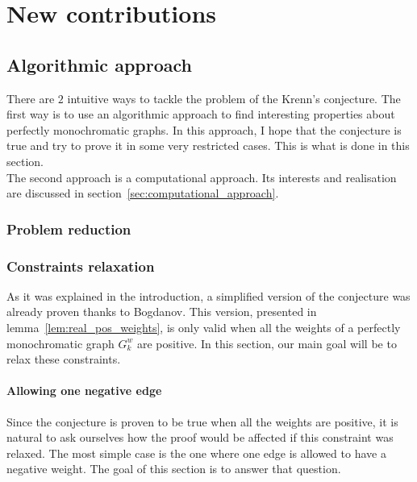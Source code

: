 \chapter{New contributions}


\section{Algorithmic approach}
\label{sec:algo_approach}

There are $2$ intuitive ways to tackle the problem of the Krenn's conjecture.
The first way is to use an algorithmic approach to find interesting properties about perfectly monochromatic graphs.
In this approach, I hope that the conjecture is true and try to prove it in some very restricted cases.
This is what is done in this section.\\

The second approach is a computational approach.
Its interests and realisation are discussed in section~\ref{sec:computational_approach}.

\subsection{Problem reduction}
\label{subsec:problem_reduction}

\subsection{Constraints relaxation}
\label{subsec:constraints_relaxation}

As it was explained in the introduction, a simplified version of the conjecture was already proven thanks to Bogdanov.\cite{bogdanov}
This version, presented in lemma~\ref{lem:real_pos_weights}, is only valid when all the weights of a perfectly monochromatic graph $G_k^w$ are positive.
In this section, our main goal will be to relax these constraints.

\subsubsection{Allowing one negative edge}
\label{subsubsec:one_negative_edge}

Since the conjecture is proven to be true when all the weights are positive, it is natural to ask ourselves how the proof would be affected if this constraint was relaxed.
The most simple case is the one where one edge is allowed to have a negative weight.
The goal of this section is to answer that question.

